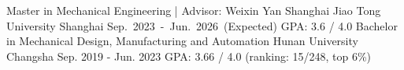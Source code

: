 
\begin{cventries}
	\cventry
	{Master in Mechanical Engineering | Advisor: Weixin Yan} %
	{Shanghai Jiao Tong University} %
	{Shanghai} %
	{Sep.~2023~-~Jun.~2026~(Expected)} %
	{
        GPA: 3.6 / 4.0
	}%
	\cventry
	{Bachelor in Mechanical Design, Manufacturing and Automation} %
	{Hunan University} %
	{Changsha} %
	{Sep. 2019 - Jun. 2023} %
	{
        GPA: 3.66 / 4.0 (ranking: 15/248, top 6\%)
	}%
	\vspace{2mm}
\end{cventries}
